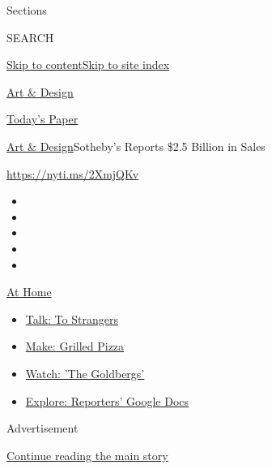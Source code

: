 Sections

SEARCH

\protect\hyperlink{site-content}{Skip to
content}\protect\hyperlink{site-index}{Skip to site index}

\href{https://www.nytimes.com/section/arts/design}{Art \& Design}

\href{https://myaccount.nytimes.com/auth/login?response_type=cookie\&client_id=vi}{}

\href{https://www.nytimes.com/section/todayspaper}{Today's Paper}

\href{/section/arts/design}{Art \& Design}\textbar{}Sotheby's Reports
\$2.5 Billion in Sales

\url{https://nyti.ms/2XmjQKv}

\begin{itemize}
\item
\item
\item
\item
\item
\end{itemize}

\href{https://www.nytimes.com/spotlight/at-home?action=click\&pgtype=Article\&state=default\&region=TOP_BANNER\&context=at_home_menu}{At
Home}

\begin{itemize}
\tightlist
\item
  \href{https://www.nytimes.com/2020/08/03/well/family/the-benefits-of-talking-to-strangers.html?action=click\&pgtype=Article\&state=default\&region=TOP_BANNER\&context=at_home_menu}{Talk:
  To Strangers}
\item
  \href{https://www.nytimes.com/2020/08/01/at-home/coronavirus-make-pizza-on-a-grill.html?action=click\&pgtype=Article\&state=default\&region=TOP_BANNER\&context=at_home_menu}{Make:
  Grilled Pizza}
\item
  \href{https://www.nytimes.com/2020/07/31/arts/television/goldbergs-abc-stream.html?action=click\&pgtype=Article\&state=default\&region=TOP_BANNER\&context=at_home_menu}{Watch:
  'The Goldbergs'}
\item
  \href{https://www.nytimes.com/interactive/2020/at-home/even-more-reporters-editors-diaries-lists-recommendations.html?action=click\&pgtype=Article\&state=default\&region=TOP_BANNER\&context=at_home_menu}{Explore:
  Reporters' Google Docs}
\end{itemize}

Advertisement

\protect\hyperlink{after-top}{Continue reading the main story}

